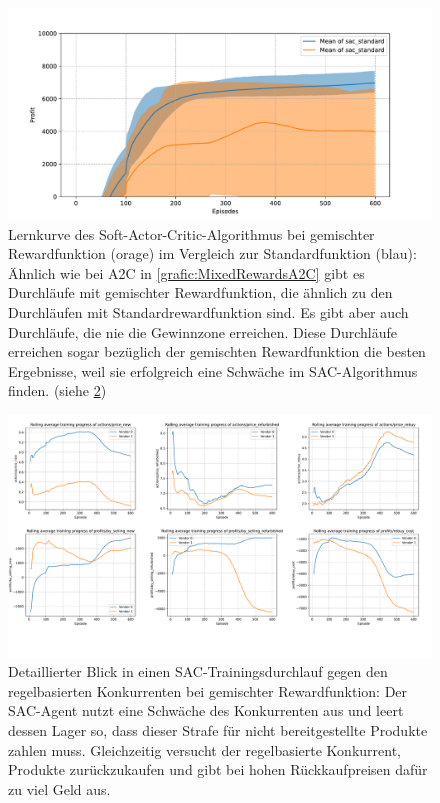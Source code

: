 \begin{figure}[htbp]
	\centering
	\includegraphics[width=\textwidth]{appendix/mixed_rewards_sac.pdf}
	\caption{
        Lernkurve des Soft-Actor-Critic-Algorithmus bei gemischter Rewardfunktion (orage) im Vergleich zur Standardfunktion (blau):
        Ähnlich wie bei A2C in \ref{grafic:MixedRewardsA2C} gibt es Durchläufe mit gemischter Rewardfunktion, die ähnlich zu den Durchläufen mit Standardrewardfunktion sind.
        Es gibt aber auch Durchläufe, die nie die Gewinnzone erreichen.
        Diese Durchläufe erreichen sogar bezüglich der gemischten Rewardfunktion die besten Ergebnisse, weil sie erfolgreich eine Schwäche im SAC-Algorithmus finden. (siehe \ref{grafic:ExplanationUnnormalSAC})
    }
	\label{grafic:MixedRewardsSAC}
\end{figure}
\begin{figure}[htbp]
	\centering
	\includegraphics[width=\textwidth]{appendix/explanation_unnormal_sac.pdf}
	\caption{
        Detaillierter Blick in einen SAC-Trainingsdurchlauf gegen den regelbasierten Konkurrenten bei gemischter Rewardfunktion:
        Der SAC-Agent nutzt eine Schwäche des Konkurrenten aus und leert dessen Lager so, dass dieser Strafe für nicht bereitgestellte Produkte zahlen muss.
        Gleichzeitig versucht der regelbasierte Konkurrent, Produkte zurückzukaufen und gibt bei hohen Rückkaufpreisen dafür zu viel Geld aus.
    }
	\label{grafic:ExplanationUnnormalSAC}
\end{figure}
